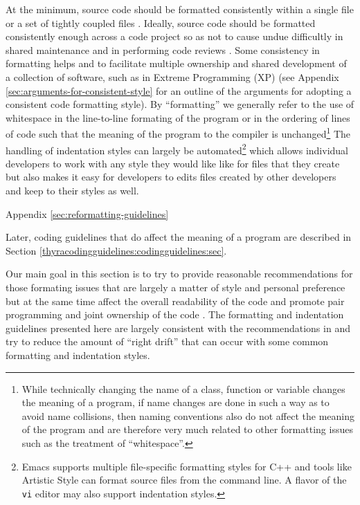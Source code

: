 At the minimum, source code should be formatted consistently within a single
file or a set of tightly coupled files {}\cite[Item 0]{C++CodingStandards05}.
Ideally, source code should be formatted consistently enough across a code
project so as not to cause undue difficultly in shared maintenance and in
performing code reviews {}\cite{CodeComplete2nd04}.  Some consistency in
formatting helps and to facilitate multiple ownership and shared development
of a collection of software, such as in Extreme Programming (XP)
{}\cite{ExtremeProgramming} (see Appendix
{}\ref{sec:arguments-for-consistent-style} for an outline of the arguments for
adopting a consistent code formatting style).  By ``formatting'' we generally
refer to the use of whitespace in the line-to-line formating of the program or
in the ordering of lines of code such that the meaning of the program to the
compiler is unchanged\footnote{While technically changing the name of a class,
function or variable changes the meaning of a program, if name changes are
done in such a way as to avoid name collisions, then naming conventions also
do not affect the meaning of the program and are therefore very much related
to other formatting issues such as the treatment of ``whitespace''.}  The
handling of indentation styles can largely be automated\footnote{Emacs
supports multiple file-specific formatting styles for C++ and tools like
Artistic Style {}\cite{ArtisticStyle} can format source files from the command
line.  A flavor of the {}\texttt{vi} editor may also support indentation
styles. } which allows individual developers to work with any style they would
like like for files that they create but also makes it easy for developers to
edits files created by other developers and keep to their styles as well.

Appendix
{}\ref{sec:reformatting-guidelines}


  Later,
coding guidelines that do affect the meaning of a program are described in
Section {}\ref{thyracodingguidelines:codingguidelines:sec}.

Our main goal in this section is to try to provide reasonable recommendations
for those formating issues that are largely a matter of style and personal
preference but at the same time affect the overall readability of the code and
promote pair programming and joint ownership of the code
{}\cite{ExtremeProgramming}.  The formatting and indentation guidelines
presented here are largely consistent with the recommendations in
{}\cite[Chapter 31]{CodeComplete2nd04} and try to reduce the amount of ``right
drift'' that can occur with some common formatting and indentation styles.

